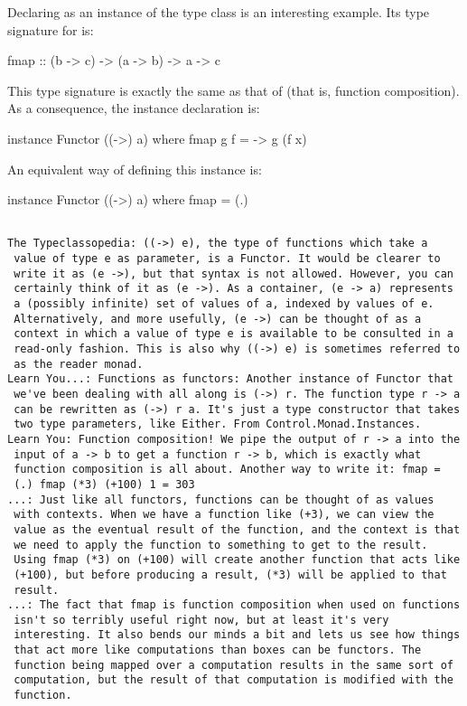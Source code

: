 \begin{example}
  \label{ex:functor-function-haskell}

  Declaring  as an instance of the 
  type class is an interesting example. Its type signature for
   is:
  \begin{codehaskell}
fmap :: (b -> c) -> (a -> b) -> a -> c
  \end{codehaskell}
  This type signature is exactly the same as that of 
  (that is, function composition). As a consequence, the instance
  declaration is:
  \begin{codehaskell}
instance Functor ((->) a) where
  fmap g f = \x -> g (f x)
  \end{codehaskell}
  An equivalent way of defining this instance is:
  \begin{codehaskell}
instance Functor ((->) a) where
  fmap = (.)
  \end{codehaskell}

\begin{verbatim}

The Typeclassopedia: ((->) e), the type of functions which take a
 value of type e as parameter, is a Functor. It would be clearer to
 write it as (e ->), but that syntax is not allowed. However, you can
 certainly think of it as (e ->). As a container, (e -> a) represents
 a (possibly infinite) set of values of a, indexed by values of e.
 Alternatively, and more usefully, (e ->) can be thought of as a
 context in which a value of type e is available to be consulted in a
 read-only fashion. This is also why ((->) e) is sometimes referred to
 as the reader monad.
Learn You...: Functions as functors: Another instance of Functor that
 we've been dealing with all along is (->) r. The function type r -> a
 can be rewritten as (->) r a. It's just a type constructor that takes
 two type parameters, like Either. From Control.Monad.Instances.
Learn You: Function composition! We pipe the output of r -> a into the
 input of a -> b to get a function r -> b, which is exactly what
 function composition is all about. Another way to write it: fmap =
 (.) fmap (*3) (+100) 1 = 303
...: Just like all functors, functions can be thought of as values
 with contexts. When we have a function like (+3), we can view the
 value as the eventual result of the function, and the context is that
 we need to apply the function to something to get to the result.
 Using fmap (*3) on (+100) will create another function that acts like
 (+100), but before producing a result, (*3) will be applied to that
 result.
...: The fact that fmap is function composition when used on functions
 isn't so terribly useful right now, but at least it's very
 interesting. It also bends our minds a bit and lets us see how things
 that act more like computations than boxes can be functors. The
 function being mapped over a computation results in the same sort of
 computation, but the result of that computation is modified with the
 function.


\end{verbatim}
\end{example}
